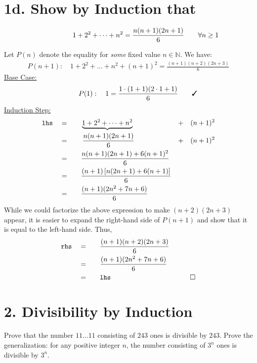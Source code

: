 \documentclass[12pt]{article}
\begin{document}
\section*{1d. Show by Induction that}
\begin{question}
  \begin{align*}
  1 + 2^{2} + \dots + n^{2} = \frac{n(n+1)(2n+1)}{6} \mathrlap{\qquad \forall n\geq 1}
  \end{align*}
\end{question}
Let $P(n)$ denote	the equality for \textit{some} fixed value $n\in\mathbb{N}$. We have:
\begin{align*}
P(n+1): \quad
  1 + 2^{2} + \ldots + n^{2} + (n+1)^{2} = \frac{(n+1)(n+2)(2n+3)}{6}
\end{align*}
\underline{Base Case:}
\begin{align*}
P(1): \quad
  1 = \frac{1\cdot(1+1)(2\cdot1+1)}{6} \mathrlap{\qquad \cmark}
\end{align*}
\underline{Induction Step:}
\begin{alignat*}{4}
\texttt{lhs} \quad
 &=& \quad &\underbrace{1 + 2^{2} +\dots+ n^{2}} \quad &+ \quad (n+1)^{2} \\
 &=& \quad &\makebox[8em]{$\dfrac{n(n+1)(2n+1)}{6}$} &+ \quad (n+1)^{2} \\
 &=& \quad & \frac{n(n+1)(2n+1)+6(n+1)^{2}}{6} \\
 &=& \quad & \frac{(n+1)\,[n(2n+1)+6(n+1)]}{6} \\
 &=& \quad & \frac{(n+1)(2n^{2}+7n+6)}{6} 
\end{alignat*}
While we could factorize the above expression to make $(n+2)(2n+3)$ appear, it is easier to expand the right-hand side of $P(n+1)$ and show that it is equal to the left-hand side. Thus,
\begin{alignat*}{4}
\texttt{rhs} \quad
 &=& \quad & \frac{(n+1)(n+2)(2n+3)}{6} \\
 &=& \quad & \frac{(n+1)(2n^{2}+7n+6)}{6} \\
 &=& \quad & \texttt{lhs} & \qed 
\end{alignat*}


\clearpage
\section*{2. Divisibility by Induction}
\begin{question}
Prove that the number $11\ldots11$ consisting of $243$ ones is divisible by $243$. Prove the generalization: for any positive integer $n$, the number consisting of $3^{n}$ ones is divisible by $3^{n}$.
\end{question}
\end{document}
